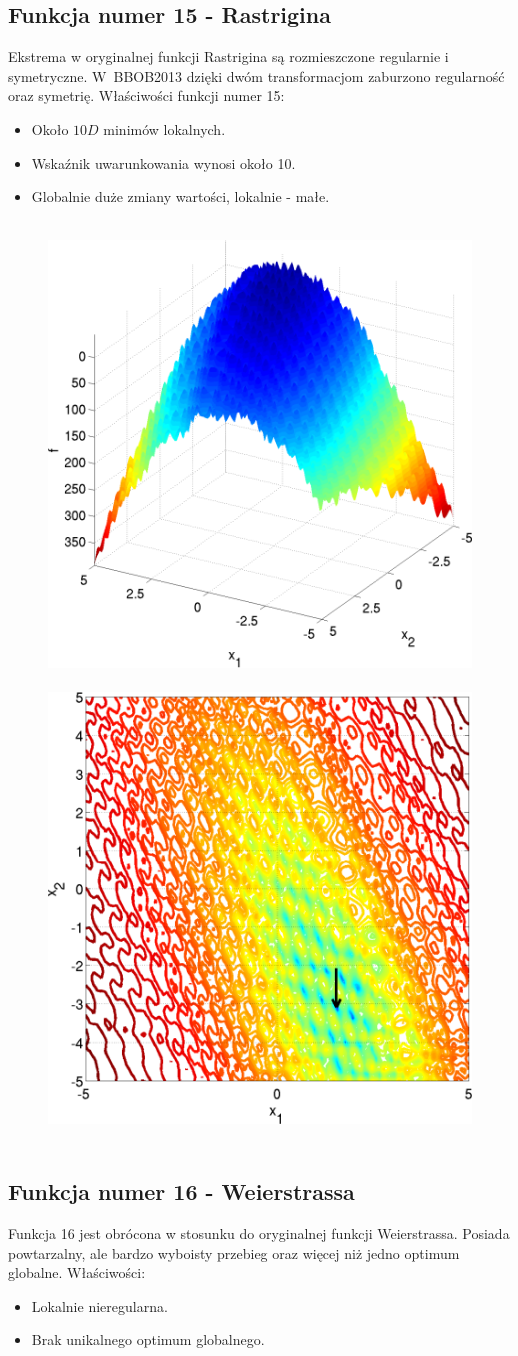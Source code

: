 \documentclass[a4paper,onecolumn,oneside,11pt,wide,floatssmall]{mwrep}
\theoremstyle{definition}
\theoremstyle{plain}%
\theoremstyle{remark}
\begin{document}
\subsection{Funkcja numer 15 - Rastrigina}

Ekstrema w oryginalnej funkcji Rastrigina są rozmieszczone regularnie i symetryczne. W~BBOB2013 dzięki dwóm transformacjom
zaburzono regularność oraz symetrię. Właściwości funkcji numer 15: 
\begin{itemize}
 \item Około $10D$ minimów lokalnych.
 \item Wskaźnik uwarunkowania wynosi około 10.
 \item Globalnie duże zmiany wartości, lokalnie - małe.
\end{itemize} 

\begin{figure}[H]
\centering
\mbox{
\includegraphics[width=.45\textwidth]{img/15.png} \quad
\includegraphics[width=.45\textwidth]{img/15a.png} 
}
\end{figure}

\subsection{Funkcja numer 16 - Weierstrassa}

Funkcja 16 jest obrócona w stosunku do oryginalnej funkcji Weierstrassa. 
Posiada powtarzalny, ale bardzo wyboisty przebieg oraz więcej niż jedno optimum globalne. Właściwości:
\begin{itemize}
 \item Lokalnie nieregularna.
 \item Brak unikalnego optimum globalnego.
\end{itemize} 
\end{document}
